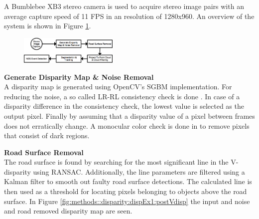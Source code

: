 \begin{multicols}{2}   

A Bumblebee XB3 stereo camera is used to acquire stereo image pairs with an average capture speed of 11 FPS in an resolution of 1280x960.  An overview of the system is shown in Figure \ref{systemOverview::systemOverview}.

\begin{figure}[H]
  \centering
  \includegraphics[width=0.42\textwidth]{text/figures/systemForeslag4.png}
  \label{systemOverview::systemOverview}
\end{figure}


\textbf{Generate Disparity Map \& Noise Removal}\\
A disparity map is generated using OpenCV's SGBM implementation. For reducing the noise, a so called LR-RL consistency check is done \cite{HirschmullerRLandSGBM}.
In case of a disparity difference in the consistency check, the lowest value is selected as the output pixel. Finally by assuming that a disparity value of a pixel between frames does not erratically change. A monocular color check is done in to remove pixels that consist of dark regions.

\textbf{Road Surface Removal}\\
The road surface is found by searching for the most significant line in the V-disparity using RANSAC. Additionally, the line parameters are filtered using a Kalman filter to smooth out faulty road surface detections. The calculated line is then used as a threshold for locating pixels belonging to objects above the road surface. In Figure \ref{fig:methods::disparity:dispEx1:postVdisp} the input and noise and road removed disparity map are seen.


\end{multicols}
